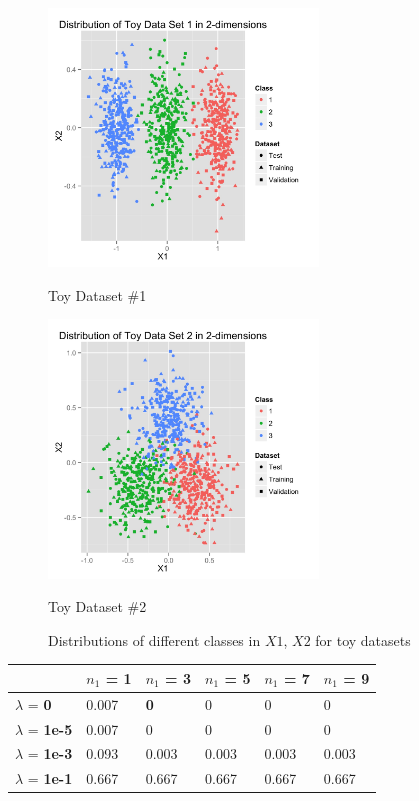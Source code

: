 \documentclass[10pt]{article}
\begin{document}
\begin{figure}[ht]
	\centering
	\begin{minipage}[b]{.48\linewidth}
		\includegraphics[width=1\linewidth, height=2.7in]{t1dist.jpg}
		\caption*{Toy Dataset \#1}
	\end{minipage}
	\begin{minipage}[b]{.48\linewidth}
		\includegraphics[width=1\linewidth, height=2.7in]{t2dist.jpg}
		\caption*{Toy Dataset \#2}
	\end{minipage}
	\caption{Distributions of different classes in $X1$, $X2$ for toy datasets}
\end{figure}

\begin{table}
\centering
\begin{tabular}{llllll}
\toprule
& $n_1$ = \bf{1} & $n_1$ =  \bf{3} & $n_1$ =  \bf{5} & $n_1$ =  \bf{7} & $n_1$ =  \bf{9} \\
\midrule
$\lambda$ = \bf{0} &  0.007 & \bf{0}     & 0     & 0     & 0     \\
$\lambda$ = \bf{1e-5} & 0.007 & 0     & 0     & 0     & 0     \\
$\lambda$ = \bf{1e-3} & 0.093 & 0.003 & 0.003 & 0.003 & 0.003 \\
$\lambda$ = \bf{1e-1} & 0.667 & 0.667 & 0.667 & 0.667 & 0.667 \\
\bottomrule
\end{tabular}
\end{table}
\end{document}
